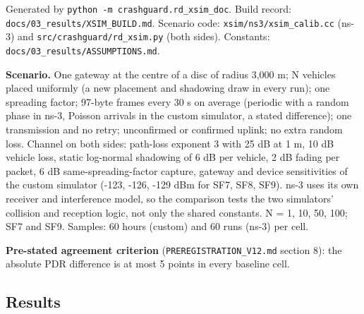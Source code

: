 


Generated by \texttt{python -m crashguard.rd\_xsim\_doc}. Build record: \texttt{docs/03\_results/XSIM\_BUILD.md}. Scenario code: \texttt{xsim/ns3/xsim\_calib.cc} (ns-3) and \texttt{src/crashguard/rd\_xsim.py} (both sides). Constants: \texttt{docs/03\_results/ASSUMPTIONS.md}.

\textbf{Scenario.} One gateway at the centre of a disc of radius 3,000 m; N vehicles placed uniformly (a new placement and shadowing draw in every run); one spreading factor; 97-byte frames every 30 s on average (periodic with a random phase in ns-3, Poisson arrivals in the custom simulator, a stated difference); one transmission and no retry; unconfirmed or confirmed uplink; no extra random loss. Channel on both sides: path-loss exponent 3 with 25 dB at 1 m, 10 dB vehicle loss, static log-normal shadowing of 6 dB per vehicle, 2 dB fading per packet, 6 dB same-spreading-factor capture, gateway and device sensitivities of the custom simulator (-123, -126, -129 dBm for SF7, SF8, SF9). ns-3 uses its own receiver and interference model, so the comparison tests the two simulators' collision and reception logic, not only the shared constants. N = 1, 10, 50, 100; SF7 and SF9. Samples: 60 hours (custom) and 60 runs (ns-3) per cell.

\textbf{Pre-stated agreement criterion} (\texttt{PREREGISTRATION\_V12.md} section 8): the absolute PDR difference is at most 5 points in every baseline cell.

\subsection*{Results}

